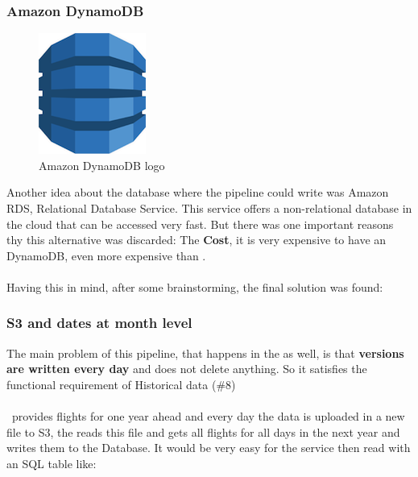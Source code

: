 \subsubsection*{Amazon DynamoDB} \label{dynamodb}

\begin{figure}[H]
\centering
\includegraphics[scale=0.2]{resources/dynamodb-logo.png}
\caption{Amazon DynamoDB logo}
\end{figure}

Another idea about the database where the pipeline could write was Amazon RDS, Relational Database Service\cite{dynamodb}. This service offers a non-relational database in the cloud that can be accessed very fast. But there was one important reasons thy this alternative was discarded: The \textbf{Cost}, it is very expensive to have an DynamoDB, even more expensive than .
\\\\
Having this in mind, after some brainstorming, the final solution was found:

\subsubsection*{S3 and dates at month level} \label{month_version}

The main problem of this pipeline, that happens in the  as well, is that \textbf{versions are written every day} and does not delete anything. So it satisfies the functional requirement of Historical data (\#8)
\\\\
\squad\ provides flights for one year ahead and every day the data is uploaded in a new file to S3, the  reads this file and gets all flights for all days in the next year and writes them to the Database. It would be very easy for the service then read with an SQL table like:

